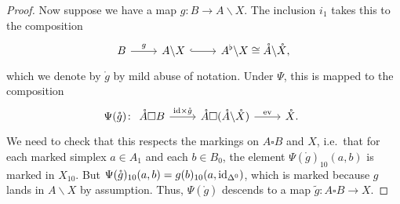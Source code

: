 \documentclass[main.tex]{subfiles}
\begin{document}
\begin{proof}
  Now suppose we have a map $g\colon B \to A \backslash X$. The inclusion $i_{1}$ takes this to the composition
  \begin{equation*}
    \begin{tikzcd}
      B
      \arrow[r, "g"]
      & A \backslash X
      \arrow[r, hook]
      & A\flt \backslash X \cong \mathring{A} \backslash \mathring{X},
    \end{tikzcd}
  \end{equation*}
  which we denote by $\mathring{g}$ by mild abuse of notation. Under $\Psi$, this is mapped to the composition
  \begin{equation*}
    \Psi(\mathring{g})\colon
    \begin{tikzcd}
      \mathring{A} \square B
      \arrow[r, "\id \times \mathring{g}"]
      & \mathring{A} \square (\mathring{A} \backslash \mathring{X})
      \arrow[r, "\ev"]
      & \mathring{X}.
    \end{tikzcd}
  \end{equation*}
  We need to check that this respects the markings on $A \square B$ and $X$, i.e.\ that for each marked simplex $a \in A_{1}$ and each $b \in B_{0}$, the element $\Psi(\mathring{g})_{10}(a, b)$ is marked in $X_{10}$. But $\Psi(\mathring{g})_{10}(a, b) = g(b)_{10}(a, \mathrm{id}_{\Delta^{0}})$, which is marked because $g$ lands in $A \backslash X$ by assumption. Thus, $\Psi(\mathring{g})$ descends to a map $\tilde{g}\colon A \square B \to X$.


\end{proof}
\end{document}
